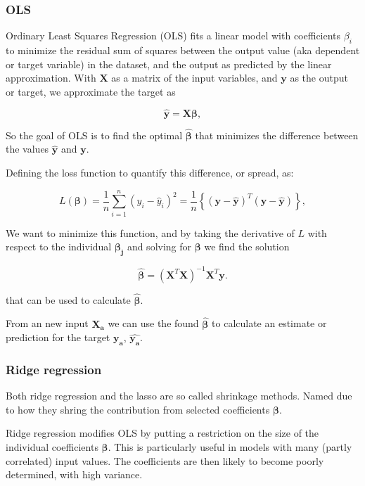 \documentclass[11pt]{article}
\begin{document}
\hypertarget{ols}{%
\subsubsection{OLS}\label{ols}}

Ordinary Least Squares Regression (OLS) fits a linear model with
coefficients \(\beta_i\) to minimize the residual sum of squares between
the output value (aka dependent or target variable) in the dataset, and
the output as predicted by the linear approximation. With
\(\boldsymbol{X}\) as a matrix of the input variables, and
\(\boldsymbol{y}\) as the output or target, we approximate the target as

\[
\boldsymbol{\hat{y}}= \boldsymbol{X}\boldsymbol{\beta},
\]

So the goal of OLS is to find the optimal \(\boldsymbol{\hat{\beta}}\)
that minimizes the difference between the values
\(\boldsymbol{\hat{y}}\) and \(\boldsymbol{y}\).

Defining the loss function to quantify this difference, or spread, as:

\[
L(\boldsymbol{\beta})=\frac{1}{n}\sum_{i=1}^{n}\left(y_i-\hat{y}_i\right)^2=\frac{1}{n}\left\{\left(\boldsymbol{y}-\boldsymbol{\hat{y}}\right)^T\left(\boldsymbol{y}-\boldsymbol{\hat{y}}\right)\right\},
\]

We want to minimize this function, and by taking the derivative of \(L\)
with respect to the individual \(\boldsymbol{\beta_j}\) and solving for
\(\boldsymbol{\beta}\) we find the solution

\[
\boldsymbol{\hat{\beta}} =\left(\boldsymbol{X}^T\boldsymbol{X}\right)^{-1}\boldsymbol{X}^T\boldsymbol{y}.
\]

that can be used to calculate \(\boldsymbol{\hat{\beta}}\).

From an new input \(\boldsymbol{X_{a}}\) we can use the found
\(\boldsymbol{\hat{\beta}}\) to calculate an estimate or prediction for
the target \(\boldsymbol{y_a}\), \(\boldsymbol{\hat{y_a}}\).

    \hypertarget{ridge-regression}{%
\subsubsection{Ridge regression}\label{ridge-regression}}

Both ridge regression and the lasso are so called shrinkage methods.
Named due to how they shring the contribution from selected coefficients
\(\boldsymbol{\beta}\).

Ridge regression modifies OLS by putting a restriction on the size of
the individual coefficients \(\boldsymbol{\beta}\). This is particularly
useful in models with many (partly correlated) input values. The
coefficients are then likely to become poorly determined, with high
variance.
\end{document}
